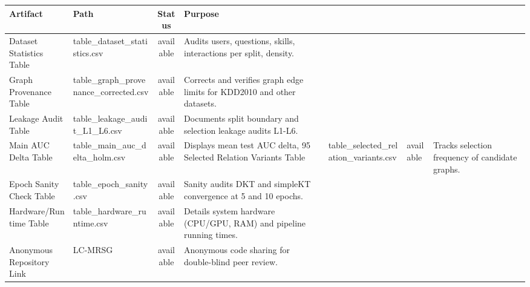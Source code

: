 \begin{tabular}{llcl}
\hline
Artifact & Path & Status & Purpose \\
\hline
Dataset Statistics Table & table_dataset_statistics.csv & available & Audits users, questions, skills, interactions per split, density. \\
Graph Provenance Table & table_graph_provenance_corrected.csv & available & Corrects and verifies graph edge limits for KDD2010 and other datasets. \\
Leakage Audit Table & table_leakage_audit_L1_L6.csv & available & Documents split boundary and selection leakage audits L1-L6. \\
Main AUC Delta Table & table_main_auc_delta_holm.csv & available & Displays mean test AUC delta, 95%
Selected Relation Variants Table & table_selected_relation_variants.csv & available & Tracks selection frequency of candidate graphs. \\
Epoch Sanity Check Table & table_epoch_sanity.csv & available & Sanity audits DKT and simpleKT convergence at 5 and 10 epochs. \\
Hardware/Runtime Table & table_hardware_runtime.csv & available & Details system hardware (CPU/GPU, RAM) and pipeline running times. \\
Anonymous Repository Link & LC-MRSG & available & Anonymous code sharing for double-blind peer review. \\
\hline
\end{tabular}